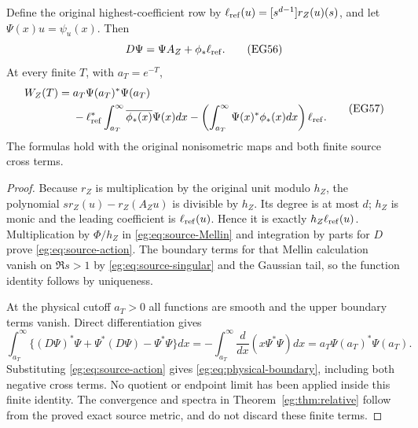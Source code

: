\begin{egtheorem}
\label{eg:thm:physical-boundary}
Define the original highest-coefficient row by
$\ell_{\rm ref}(u)=[s^{d-1}]r_Z(u)(s)$, and let
$\Psi(x)u=\psi_u(x)$. Then
\[
 D\Psi=\Psi A_Z+\phi_*\ell_{\rm ref}.
 \tag{EG56}\label{eg:eq:source-action}
\]
At every finite $T$, with $a_T=e^{-T}$,
\[
 \begin{split}
 W_Z(T)={}&a_T\Psi(a_T)^*\Psi(a_T)\\
 &-\ell_{\rm ref}^*\int_{a_T}^\infty\overline{\phi_*(x)}\Psi(x)dx
 -\left(\int_{a_T}^\infty\Psi(x)^*\phi_*(x)dx\right)\ell_{\rm ref}.
 \end{split}\tag{EG57}\label{eg:eq:physical-boundary}
\]
The formulas hold with the original nonisometric maps and both
finite source cross terms.
\end{egtheorem}
\begin{proof}
Because $r_Z$ is multiplication by the original unit modulo $h_Z$,
the polynomial $s r_Z(u)-r_Z(A_Zu)$ is divisible by $h_Z$.
Its degree is at most $d$; $h_Z$ is monic and the leading coefficient
is $\ell_{\rm ref}(u)$. Hence it is exactly
$h_Z\ell_{\rm ref}(u)$. Multiplication by $\Phi/h_Z$ in
\eqref{eg:eq:source-Mellin} and integration by parts for $D$ prove
\eqref{eg:eq:source-action}. The boundary terms for that Mellin
calculation vanish on $\Re s>1$ by \eqref{eg:eq:source-singular} and
the Gaussian tail, so the function identity follows by uniqueness.

At the physical cutoff $a_T>0$ all functions are smooth and the
upper boundary terms vanish. Direct differentiation gives
\[
 \int_{a_T}^\infty\{(D\Psi)^*\Psi+\Psi^*(D\Psi)-\Psi^*\Psi\}dx
 =-\int_{a_T}^\infty\frac{d}{dx}(x\Psi^*\Psi)dx
 =a_T\Psi(a_T)^*\Psi(a_T).
\]
Substituting \eqref{eg:eq:source-action} gives
\eqref{eg:eq:physical-boundary}, including both negative cross terms.
No quotient or endpoint limit has been applied inside this finite
identity. The convergence and spectra in
Theorem~\ref{eg:thm:relative} follow from the proved exact source metric,
and do not discard these finite terms.
\end{proof}

